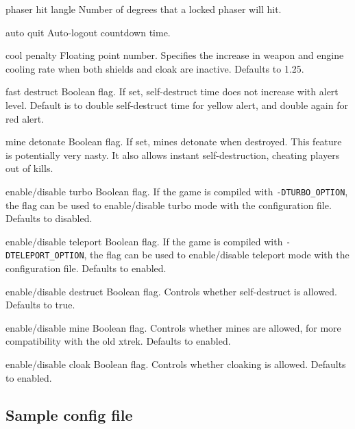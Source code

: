 \begin{list}{}{
	\renewcommand{\makelabel}[1]{{\tt #1 \hfill}}
         \setlength{\leftmargin}{1.5in} \setlength{\labelwidth}{\leftmargin}
         \setlength{\labelsep}{0in}
         \setlength{\itemsep}{.2em}
}
\item[phaser hit langle]  Number of degrees that a locked phaser will hit.

\item[auto quit]  Auto-logout countdown time.

\item[cool penalty]   Floating point number.  Specifies the increase
in weapon and engine cooling rate when both shields and cloak are inactive.
Defaults to 1.25.

\item[fast destruct]  Boolean flag.  If set, self-destruct time does not
increase with alert level.   Default is to double self-destruct time for
yellow alert, and double again for red alert.

\item[mine detonate]  Boolean flag.   If set, mines detonate when
destroyed.  This feature is potentially very nasty.  It also allows instant
self-destruction, cheating players out of kills.

\item[enable/disable turbo] Boolean flag.  If the game is compiled with
      \verb|-DTURBO_OPTION|, the flag can be used to enable/disable turbo
      mode with the configuration file.  Defaults to disabled.

\item[enable/disable teleport] Boolean flag.  If the game is compiled with
      \verb|-DTELEPORT_OPTION|, the flag can be used to enable/disable teleport
      mode with the configuration file.  Defaults to enabled.

\item[enable/disable destruct] Boolean flag.  Controls whether self-destruct
      is allowed.  Defaults to true. 

\item[enable/disable mine] Boolean flag.  Controls whether mines are allowed,
      for more compatibility with the old xtrek.  Defaults to enabled.

\item[enable/disable cloak] Boolean flag.  Controls whether cloaking is 
     allowed. Defaults to enabled.


\end{list}

\subsection{Sample config file}

